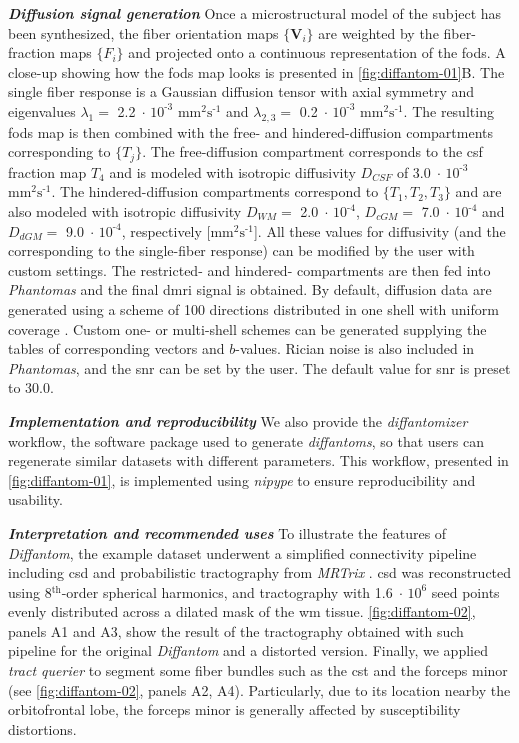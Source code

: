 \documentclass[english]{frontiers/frontiersSCNS} %
\providecommand{\diffantom}{\emph{Diffantom}}
\newcommand{\e}[1]{\ensuremath{\;\cdot\,\text{10}^\text{#1}}}
\newcommand{\diffunits}{\ensuremath{\text{mm}^2\text{s}^{\text{-1}}}}
\begin{document}
\noindent\textbf{\textit{Diffusion signal generation\textcolon}\label{sec:diffantom-data-dwi}} %
Once a microstructural model of the subject has been synthesized, the fiber orientation maps $\{\mathbf{V}_i\}$
  are weighted by the fiber-fraction maps $\{F_i\}$ and projected onto a continuous representation of
  the \glspl{fod}.
A close-up showing how the \glspl{fod} map looks is presented in \autoref{fig:diffantom-01}B.
The single fiber response is a Gaussian diffusion tensor with axial symmetry and eigenvalues $\lambda_1=$ 2.2\e{-3}
  \diffunits{} and $\lambda_{2,3}=$ 0.2\e{-3} \diffunits{}.
The resulting \glspl{fod} map is then combined with the free- and hindered-diffusion compartments corresponding to $\{T_j\}$.
The free-diffusion compartment corresponds to the \gls*{csf} fraction map $T_4$ and is modeled with isotropic
  diffusivity $D_{CSF}$ of 3.0\e{-3} \diffunits{}.
The hindered-diffusion compartments correspond to $\{T_1,T_2,T_3\}$ and are also modeled with isotropic diffusivity
  $D_{WM} =$ 2.0\e{-4}, $D_{cGM} =$ 7.0\e{-4} and $D_{dGM} =$ 9.0\e{-4}, respectively [\diffunits{}].
All these values for diffusivity (and the corresponding to the single-fiber response) can be modified by the user with
  custom settings.
The restricted- and hindered- compartments are then fed into \emph{Phantomas} \citep{caruyer_phantomas_2014}
  and the final \gls*{dmri} signal is obtained.
By default, diffusion data are generated using a scheme of 100 directions distributed in one shell with uniform
  coverage \citep{caruyer_design_2013}.
Custom one- or multi-shell schemes can be generated supplying the tables of corresponding vectors and $b$-values.
Rician noise is also included in \emph{Phantomas}, and the \gls*{snr} can be set by the user.
The default value for \gls*{snr} is preset to 30.0.


\noindent\textbf{\textit{Implementation and reproducibility\textcolon}\label{sec:data_workflow}} %
We also provide the \emph{diffantomizer} workflow, the software package used to generate \emph{diffantoms}, so
  that users can regenerate similar datasets with different parameters.
This workflow, presented in \autoref{fig:diffantom-01}, is implemented using
  \emph{nipype} \citep{gorgolewski_nipype_2011} to ensure reproducibility and usability.

\noindent\textbf{\textit{Interpretation and recommended uses\textcolon}\label{sec:diffantom-data-use}} %
To illustrate the features of \diffantom{}, the example dataset underwent a simplified
  connectivity pipeline including \gls*{csd} and probabilistic tractography from
  \emph{MRTrix} \citep{tournier_mrtrix_2012}.
\Gls*{csd} was reconstructed using 8$^\text{th}$-order spherical harmonics, and tractography with 1.6\e{6}
  seed points evenly distributed across a dilated mask of the \gls*{wm} tissue.
\autoref{fig:diffantom-02}, panels A1 and A3, show the result of the tractography obtained with such pipeline for
  the original \diffantom{} and a distorted version.
Finally, we applied \emph{tract querier} \citep{wassermann_on_2013} to segment some fiber bundles such
  as the \gls*{cst} and the forceps minor (see \autoref{fig:diffantom-02}, panels A2, A4).
Particularly, due to its location nearby the orbitofrontal lobe, the forceps minor is generally affected by
  susceptibility distortions.
\end{document}
